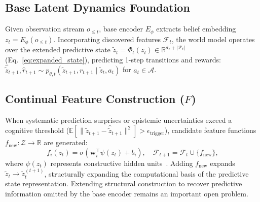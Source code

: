 \documentclass{article}
\theoremstyle{definition}
\begin{document}
\subsection{Base Latent Dynamics Foundation}
{\setlength{\abovedisplayskip}{3pt}\setlength{\belowdisplayskip}{3pt}
Given observation stream $o_{\le t}$, base encoder $E_\phi$ extracts belief embedding $z_t = E_\phi(o_{\le t})$. Incorporating discovered features $\mathcal{F}_t$, the world model operates over the extended predictive state $\tilde{z}_t = \Phi_t(z_t) \in \mathbb{R}^{d_z + |\mathcal{F}_t|}$ (Eq.~\ref{eq:expanded_state}), predicting 1-step transitions and rewards: $\hat{\tilde{z}}_{t+1}, \hat{r}_{t+1} \sim p_{\theta, t}(\tilde{z}_{t+1}, r_{t+1} \mid \tilde{z}_t, a_t)$ for $a_t \in \mathcal{A}$.

\subsection{Continual Feature Construction \texorpdfstring{($F$)}{(F)}}
\enlargethispage{1.8\baselineskip}
When systematic prediction surprises or epistemic uncertainties exceed a cognitive threshold ($\mathbb{E}[\|\tilde{z}_{t+1} - \hat{\tilde{z}}_{t+1}\|^2] > \epsilon_{\text{trigger}}$), candidate feature functions $f_{\text{new}}: \mathcal{Z} \to \mathbb{R}$ are generated:
\begin{equation}
\label{eq:feature_generation}
f_i(z_t) = \sigma\left(\bm{w}_i^\top \psi(z_t) + b_i\right), \quad \mathcal{F}_{t+1} = \mathcal{F}_t \cup \{f_{\text{new}}\},
\end{equation}
where $\psi(z_t)$ represents constructive hidden units~\citep{javed2023constructive, kearney2019learning}. Adding $f_{\text{new}}$ expands $\tilde{z}_t \to \tilde{z}_t^{(t+1)}$, structurally expanding the computational basis of the predictive state representation. Extending structural construction to recover predictive information omitted by the base encoder remains an important open problem.

}
\end{document}
